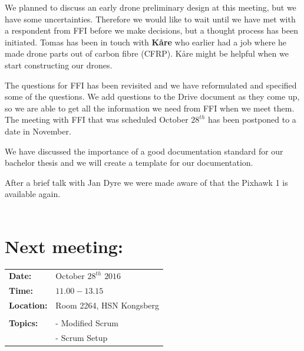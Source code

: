 \documentclass{article}
\begin{document}
We planned to discuss an early drone preliminary design at this meeting, but we have some uncertainties. Therefore we would like to wait until we have met with a respondent from FFI before we make decisions, but a thought process has been initiated. Tomas has been in touch with \textbf{Kåre} who earlier had a job where he made drone parts out of carbon fibre (CFRP). Kåre might be helpful when we start constructing our drones.

The questions for FFI has been revisited and we have reformulated and specified some of the questions. We add questions to the Drive document as they come up, so we are able to get all the information we need from FFI when we meet them. The meeting with FFI that was scheduled October $28^{th}$ has been postponed to a date in November. 

We have discussed the importance of a good documentation standard for our bachelor thesis and we will create a template for our documentation. 

After a brief talk with Jan Dyre we were made aware of that the Pixhawk 1 is available again. \\\\



\section*{Next meeting:}   
\begin{tabular}{ll}                                              
\textbf{Date:} 	            & October $28^{th}$ $2016$	         \\
\textbf{Time:}		        & $11.00 - 13.15$				     \\
\textbf{Location:}	        & Room 2264, HSN Kongsberg	         \\\\
\textbf{Topics:}            & - Modified Scrum                   \\
				        	& - Scrum Setup                      \\  
				    
				        
				        	

\end{tabular}
\end{document}

